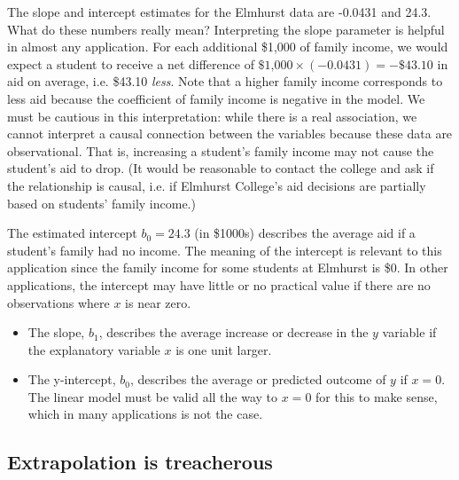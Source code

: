 \begin{example}{The slope and intercept estimates for the Elmhurst data are -0.0431 and 24.3. What do these numbers really mean?}
Interpreting the slope parameter is helpful in almost any application. For each additional \$1,000 of family income, we would expect a student to receive a net difference of $\$\text{1,000}\times (-0.0431) = -\$43.10$ in aid on average, i.e. \$43.10 \emph{less}. Note that a higher family income corresponds to less aid because the coefficient of family income is negative in the model. We must be cautious in this interpretation: while there is a real association, we cannot interpret a causal connection between the variables because these data are observational. That is, increasing a student's family income may not cause the student's aid to drop. (It would be reasonable to contact the college and ask if the relationship is causal, i.e. if Elmhurst College's aid decisions are partially based on students' family income.)

The estimated intercept $b_0=24.3$ (in \$1000s) describes the average aid if a student's family had no income. The meaning of the intercept is relevant to this application since the family income for some students at Elmhurst is \$0. In other applications, the intercept may have little or no practical value if there are no observations where $x$ is near zero.
\end{example}

\begin{termBox}{
\vspace{-4mm}
\begin{itemize}
\setlength{\itemsep}{0mm}
\item The slope, $b_1$, describes the average increase or decrease in the $y$ variable if the explanatory variable $x$ is one unit larger. 
\item The y-intercept, $b_0$, describes the average or predicted outcome of $y$ if $x=0$.  The linear model must be valid all the way to $x=0$ for this to make sense, which in many applications is not the case.
\end{itemize}
}
\end{termBox}



\subsection{Extrapolation is treacherous}

